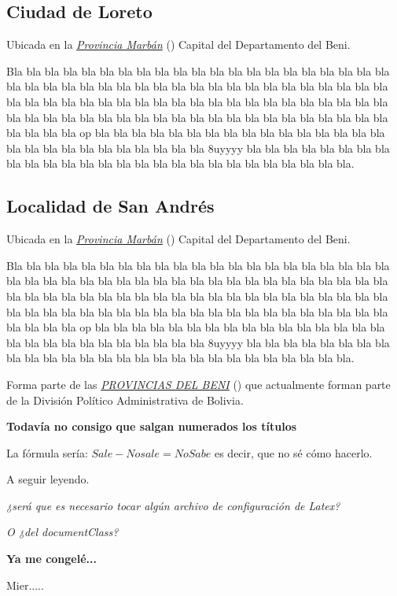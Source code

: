 \documentclass[letterpaper,10pt,english]{sphinxmanual}
\begin{document}
\subsection{Ciudad de Loreto}
\label{marban:loreto}\label{marban:ciudad-de-loreto}
Ubicada en la {\hyperref[marban:marban]{\emph{Provincia Marbán}}} () Capital del Departamento del Beni.

Bla bla bla bla bla bla bla bla bla bla bla bla bla bla bla bla bla bla bla bla bla bla bla bla bla bla bla bla bla bla bla bla bla bla
bla bla bla bla bla bla bla bla bla bla bla bla bla bla bla bla bla bla bla bla bla bla bla bla bla bla bla
bla bla bla bla bla bla bla bla bla bla bla bla bla bla bla bla bla bla bla bla bla bla bla bla bla bla bla op
bla bla bla bla bla bla bla bla bla bla bla bla bla bla bla bla bla bla bla bla bla bla bla bla bla bla bla 8uyyyy
bla bla bla bla bla bla bla bla bla bla bla bla bla bla bla bla bla bla bla bla bla bla bla bla bla bla bla.


\subsection{Localidad de San Andrés}
\label{marban:san-andres}\label{marban:localidad-de-san-andres}
Ubicada en la {\hyperref[marban:marban]{\emph{Provincia Marbán}}} () Capital del Departamento del Beni.

Bla bla bla bla bla bla bla bla bla bla bla bla bla bla bla bla bla bla bla bla bla bla bla bla bla bla bla bla bla bla bla bla bla bla
bla bla bla bla bla bla bla bla bla bla bla bla bla bla bla bla bla bla bla bla bla bla bla bla bla bla bla
bla bla bla bla bla bla bla bla bla bla bla bla bla bla bla bla bla bla bla bla bla bla bla bla bla bla bla op
bla bla bla bla bla bla bla bla bla bla bla bla bla bla bla bla bla bla bla bla bla bla bla bla bla bla bla 8uyyyy
bla bla bla bla bla bla bla bla bla bla bla bla bla bla bla bla bla bla bla bla bla bla bla bla bla bla bla.

Forma parte de las {\hyperref[provincias:provincias]{\emph{PROVINCIAS DEL BENI}}} () que actualmente forman parte de la División Político Administrativa de Bolivia.

\textbf{Todavía no consigo que salgan numerados los títulos}

La fórmula sería: \(Sale - Nosale = NoSabe\) es decir, que no sé cómo hacerlo.

A seguir leyendo.

\emph{¿será que es necesario tocar algún archivo de configuración de Latex?}

\emph{O ¿del documentClass?}

\textbf{Ya me congelé...}

Mier.....



\renewcommand{\indexname}{Index}
\printindex
\end{document}
